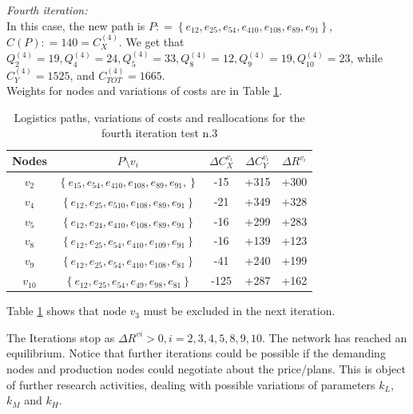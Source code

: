 \textit{Fourth iteration:}\\
In this case, the new path is $P : = \left\{e_{12},e_{25}, e_{54}, e_{410}, e_{108}, e_{89}, e_{91} \right\}$, $C(P) : = 140 = C_X^{(4)}$. We get that $Q_2^{(4)} = 19, Q_4^{(4)} = 24, Q_5^{(4)} = 33,Q_8^{(4)} = 12,Q_9^{(4)} = 19,Q_10^{(4)} = 23$, while $C_Y^{(4)} = 1525$, and $C_{TOT}^{(4)} = 1665$.\\
Weights for nodes and variations of costs are in Table \ref{tab:reallocation-plan-fourth-it-test3}.
\begin{table}[h]
    \centering
    \begin{tabular}{|c|c|c|c|c|}
        \hline
        \textbf{Nodes} & \textbf{$P \setminus v_i$} & \textbf{$\Delta C_X^{v_i}$} & \textbf{$\Delta C_Y^{v_i}$} & \textbf{$\Delta R^{v_i}$} \\
        \hline
        $v_2$ & $\left\{e_{15},  e_{54}, e_{410}, e_{108}, e_{89}, e_{91}, \right\}$ & -15 & +315 & +300 \\
        \hline
        $v_4$ & $\left\{e_{12},  e_{25},  e_{510},  e_{108},  e_{89},  e_{91}  \right\}$ & -21 & +349 & +328 \\
        \hline
        $v_5$ & $\left\{ e_{12},  e_{24},  e_{410},  e_{108},  e_{89},  e_{91}  \right\}$ & -16 & +299 & +283 \\
        \hline
        $v_8$ & $\left\{e_{12},  e_{25},  e_{54},  e_{410},  e_{109},  e_{91}   \right\}$ & -16 & +139 & +123 \\
        \hline
        $v_9$ & $\left\{e_{12},  e_{25},  e_{54},  e_{410},  e_{108},  e_{81}   \right\}$ & -41 & +240 & +199 \\
        \hline
        $v_10$ & $\left\{ e_{12},  e_{25},  e_{54},  e_{49},  e_{98},  e_{81}  \right\}$ & -125 & +287 & +162 \\
        \hline
    \end{tabular}

    \caption{Logistics paths, variations of costs and reallocations for the fourth iteration test n.3}
    \label{tab:reallocation-plan-fourth-it-test3}
\end{table}
Table \ref{tab:reallocation-plan-fourth-it-test3} shows that node $v_3$ must be excluded in the next iteration.

The Iterations stop as $\Delta R^{vi} > 0, i = 2,3,4,5,8,9,10$. The network has reached an equilibrium. Notice that further iterations could be possible if the demanding nodes and production nodes could negotiate about the price/plans. This is object of further research activities, dealing with possible variations of parameters $k_L$, $k_M$ and $k_H$.
